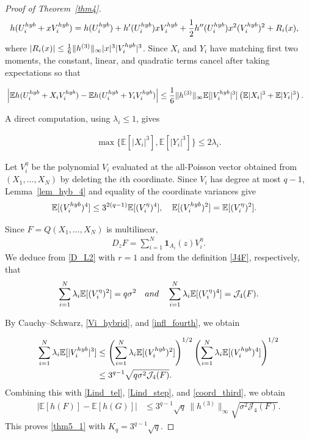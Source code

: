 \documentclass[10pt,a4paper]{amsart}
\newcommand{\AND}{\quad{\rm and}\quad}
\newcommand{\E}{\mathbb{E}}
\newcommand{\Jfour}{\mathcal J_4}
\newcommand{\ind}{\mathbf{1}}
\newcommand{\noi}{\noindent}
\begin{document}
\begin{proof}[Proof of Theorem~\ref{thm4}]
\noi
\begin{align*}
 h(U_i^{\rm hyb}+xV_i^{\rm hyb})
 &=
 h(U_i^{\rm hyb})
 +h'(U_i^{\rm hyb})xV_i^{\rm hyb}
 +\frac12h''(U_i^{\rm hyb})x^2
 (V_i^{\rm hyb})^2
 +R_i(x),
\end{align*}
where
$|R_i(x)|\leq\frac16\|h^{(3)}\|_\infty
|x|^3|V_i^{\rm hyb}|^3$.
Since $X_i$ and $Y_i$ have matching first two moments, the constant,
linear, and quadratic terms cancel after taking expectations
so that

\noi
\begin{align}
 &\left|
 \E h(U_i^{\rm hyb}+X_iV_i^{\rm hyb})
 -
 \E h(U_i^{\rm hyb}+Y_iV_i^{\rm hyb})
 \right|
\leq
 \frac{1}{6} \| h^{(3)}\|_\infty
 \E[|V_i^{\rm hyb}|^3]
 \left(
 \E|X_i|^3+\E|Y_i|^3
 \right).
 \label{Lind_step}
\end{align}


A direct computation, using $\lambda_i\leq1$, gives

\noi
 \begin{align} \label{coord_third}
\max\{\E[|X_i|^3],\E[|Y_i|^3]\}\leq2\lambda_i.
\end{align}


Let $V_i^\eta$ be the polynomial $V_i$ evaluated at the all-Poisson
vector obtained from $(X_1,\ldots,X_N)$ by deleting the $i$th
coordinate.  Since $V_i$ has degree at most $q-1$, Lemma~\ref{lem_hyb_4}
and equality of the coordinate variances give
\noi
\begin{align}
 \E[(V_i^{\rm hyb})^4]
 &\leq3^{2(q-1)}\E[(V_i^\eta)^4],
 \quad
 \E[(V_i^{\rm hyb})^2]=\E[(V_i^\eta)^2].
 \label{Vi_hybrid}
\end{align}


Since $F=Q(X_1,\ldots,X_N)$ is multilinear,
\noi
\begin{align*}
 D_zF=\sum_{i=1}^N\ind_{A_i}(z)V_i^\eta.
\end{align*}
We deduce from \eqref{D_L2} with $r=1$ and from the definition
\eqref{J4F}, respectively, that
\noi
\begin{align}
 \sum_{i=1}^N\lambda_i\E[(V_i^\eta)^2]
 =q\sigma^2
 \AND
 \sum_{i=1}^N\lambda_i\E[(V_i^\eta)^4]
 =\Jfour(F).
 \label{infl_fourth}
\end{align}

By Cauchy--Schwarz, \eqref{Vi_hybrid}, and \eqref{infl_fourth},
we obtain

\noi
\begin{align*}
 \sum_{i=1}^N
 \lambda_i\E[|V_i^{\rm hyb}|^3]
 &\leq
 \left(
 \sum_{i=1}^N
 \lambda_i\E[(V_i^{\rm hyb})^2]
 \right)^{1/2}
 \left(
 \sum_{i=1}^N
 \lambda_i\E[(V_i^{\rm hyb})^4]
 \right)^{1/2}\\
 &\leq
 3^{q-1}
 \sqrt{q\sigma^2\Jfour(F)}.
\end{align*}
Combining this with
\eqref{Lind_tel}, \eqref{Lind_step}, and
\eqref{coord_third}, we obtain
\noi
\begin{align*}
 |\E[h(F)]-\E[h(G)]|
 &\leq
 3^{q-1}\sqrt q\,
 \|h^{(3)}\|_\infty
 \sqrt{\sigma^2\Jfour(F)}.
\end{align*}
This proves \eqref{thm5_1} with $K_q=3^{q-1}\sqrt q$.



\end{proof}
\end{document}
